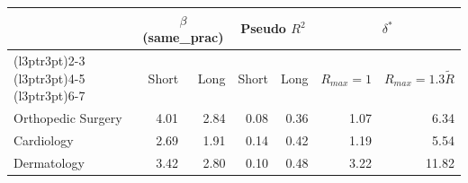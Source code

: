 \begin{tabular}{lrrrrrr}
\toprule
 & \multicolumn{2}{c}{$\beta$ (same\_prac)} & \multicolumn{2}{c}{Pseudo $R^2$} & \multicolumn{2}{c}{$\delta^*$} \\
\cmidrule(l{3pt}r{3pt}){2-3} \cmidrule(l{3pt}r{3pt}){4-5} \cmidrule(l{3pt}r{3pt}){6-7}
 & Short & Long & Short & Long & $R_{max}=1$ & $R_{max}=1.3\tilde{R}$ \\
\midrule
Orthopedic Surgery & 4.01 & 2.84 & 0.08 & 0.36 & 1.07 & 6.34 \\
Cardiology & 2.69 & 1.91 & 0.14 & 0.42 & 1.19 & 5.54 \\
Dermatology & 3.42 & 2.80 & 0.10 & 0.48 & 3.22 & 11.82 \\
\bottomrule
\end{tabular}
